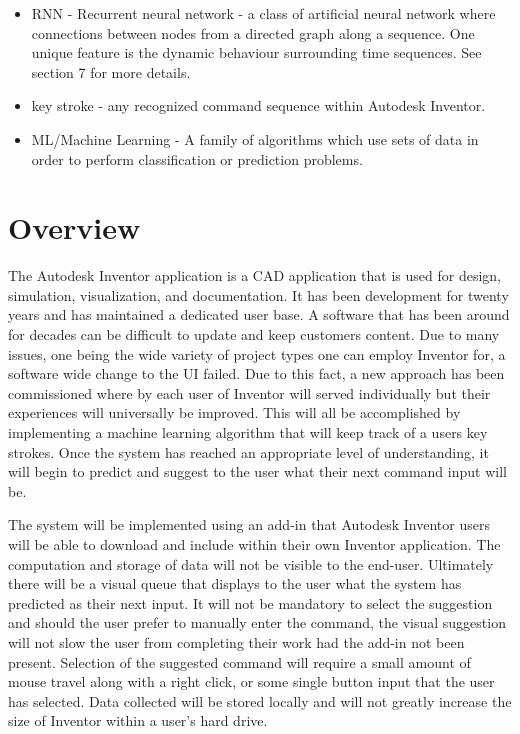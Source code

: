 \documentclass[onecolumn, draftclsnofoot,10pt, compsoc]{IEEEtran}
\begin{document}
\begin{itemize}
\item RNN - Recurrent neural network - a class of artificial neural network where connections between nodes from a directed graph along a sequence. One unique feature is the dynamic behaviour surrounding time sequences. See section 7 for more details. 
\item key stroke - any recognized command sequence within Autodesk Inventor. 
\item ML/Machine Learning - A family of algorithms which use sets of data in order to perform classification or prediction problems.
\end{itemize}
\null\newpage
\section{Overview}
The Autodesk Inventor application is a CAD application that is used for design, simulation, visualization, and documentation. It has been development for twenty years and has maintained a dedicated user base. A software that has been around for decades can be difficult to update and keep customers content. Due to many issues, one being the wide variety of project types one can employ Inventor for, a software wide change to the UI failed. Due to this fact, a new approach has been commissioned where by each user of Inventor will served individually but their experiences will universally be improved. This will all be accomplished by implementing a machine learning algorithm that will keep track of a users key strokes. Once the system has reached an appropriate level of understanding, it will begin to predict and suggest to the user what their next command input will be. 

The system will be implemented using an add-in that Autodesk Inventor users will be able to download and include within their own Inventor application. The computation and storage of data will not be visible to the end-user. Ultimately there will be a visual queue that displays to the user what the system has predicted as their next input. It will not be mandatory to select the suggestion and should the user prefer to manually enter the command, the visual suggestion will not slow the user from completing their work had the add-in not been present. Selection of the suggested command will require a small amount of mouse travel along with a right click, or some single button input that the user has selected. Data collected will be stored locally and will not greatly increase the size of Inventor within a user's hard drive. 
\end{document}

